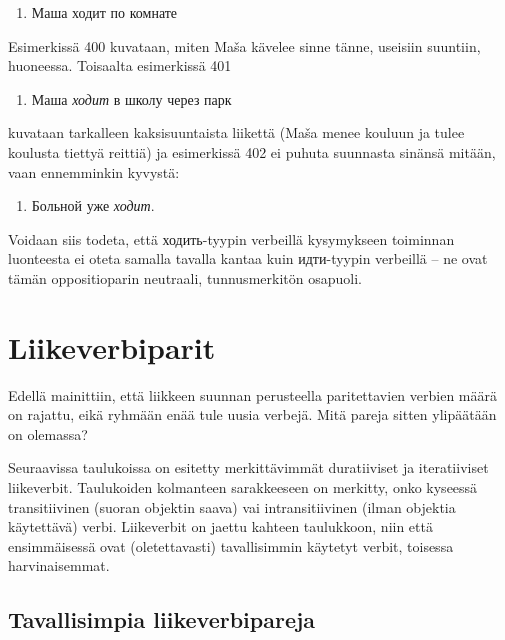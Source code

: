 \documentclass[]{scrreprt}
\providecommand{\tightlist}{%
  \setlength{\itemsep}{0pt}\setlength{\parskip}{0pt}}
\begin{document}
\begin{enumerate}
\def\labelenumi{(\arabic{enumi})}
\setcounter{enumi}{399}
\tightlist
\item
  Маша ходит по комнате
\end{enumerate}

Esimerkissä 400 kuvataan, miten Maša kävelee sinne tänne, useisiin
suuntiin, huoneessa. Toisaalta esimerkissä 401

\begin{enumerate}
\def\labelenumi{(\arabic{enumi})}
\setcounter{enumi}{400}
\tightlist
\item
  Маша \emph{ходит} в школу через парк
\end{enumerate}

kuvataan tarkalleen kaksisuuntaista liikettä (Maša menee kouluun ja
tulee koulusta tiettyä reittiä) ja esimerkissä 402 ei puhuta suunnasta
sinänsä mitään, vaan ennemminkin kyvystä:

\begin{enumerate}
\def\labelenumi{(\arabic{enumi})}
\setcounter{enumi}{401}
\tightlist
\item
  Больной уже \emph{ходит}.
\end{enumerate}

Voidaan siis todeta, että ходить-tyypin verbeillä kysymykseen toiminnan
luonteesta ei oteta samalla tavalla kantaa kuin идти-tyypin verbeillä --
ne ovat tämän oppositioparin neutraali, tunnusmerkitön osapuoli.

\section{Liikeverbiparit}\label{liikeverbiparit}

Edellä mainittiin, että liikkeen suunnan perusteella paritettavien
verbien määrä on rajattu, eikä ryhmään enää tule uusia verbejä. Mitä
pareja sitten ylipäätään on olemassa?

Seuraavissa taulukoissa on esitetty merkittävimmät duratiiviset ja
iteratiiviset liikeverbit. Taulukoiden kolmanteen sarakkeeseen on
merkitty, onko kyseessä transitiivinen (suoran objektin saava) vai
intransitiivinen (ilman objektia käytettävä) verbi. Liikeverbit on
jaettu kahteen taulukkoon, niin että ensimmäisessä ovat (oletettavasti)
tavallisimmin käytetyt verbit, toisessa harvinaisemmat.

\subsection{Tavallisimpia
liikeverbipareja}\label{tavallisimpia-liikeverbipareja}
\end{document}
